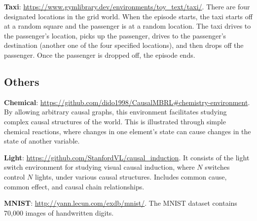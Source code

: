 \documentclass[10pt]{article} %
\theoremstyle{definition}
\begin{document}
\textbf{Taxi}: \url{https://www.gymlibrary.dev/environments/toy_text/taxi/}. There are four designated locations in the grid world. When the episode starts, the taxi starts off at a random square and the passenger is at a random location. The taxi drives to the passenger’s location, picks up the passenger, drives to the passenger’s destination (another one of the four specified locations), and then drops off the passenger. Once the passenger is dropped off, the episode ends.

\subsection{Others}
\textbf{Chemical}: \url{https://github.com/dido1998/CausalMBRL#chemistry-environment}. By allowing arbitrary causal graphs, this environment facilitates studying complex causal structures of the world. This is illustrated through simple chemical reactions, where changes in one element's state can cause changes in the state of another variable.

\textbf{Light}: \url{https://github.com/StanfordVL/causal_induction}. It consists of the light switch environment for studying visual causal induction, where $N$ switches control $N$ lights, under various causal structures. Includes common cause, common effect, and causal chain relationships.

\textbf{MNIST}: \url{http://yann.lecun.com/exdb/mnist/}. The MNIST dataset contains 70,000 images of handwritten digits.
\end{document}
